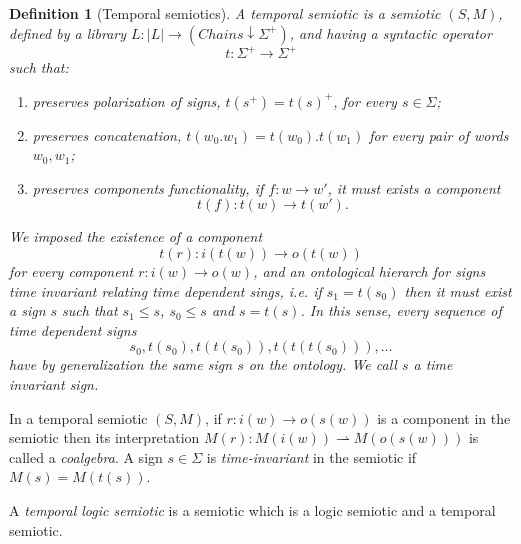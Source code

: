 \documentclass[oribibl]{llncs}
\newtheorem{defn}{Definition}
\begin{document}
\begin{defn}[Temporal semiotics]
A \emph{temporal semiotic} is a semiotic $(S,M)$, defined by a library $L:|L|\rightarrow (Chains\downarrow \Sigma^+)$, and having a syntactic operator \[t:\Sigma^+\rightarrow \Sigma^+\] such that:
\begin{enumerate}
  \item preserves polarization of signs, $t(s^+)=t(s)^+$, for every $s\in\Sigma$;
  \item preserves concatenation, $t(w_0.w_1)=t(w_0).t(w_1)$ for every pair of words $w_0,w_1$;
  \item preserves components functionality, if $f:w\rightarrow w'$, it must exists a component \[t(f):t(w)\rightarrow t(w').\]
\end{enumerate}
We imposed the existence of a component \[t(r):i(t(w))\rightarrow o(t(w))\] for every component $r:i(w)\rightarrow o(w)$, and an ontological hierarch for signs time invariant relating time dependent sings, i.e. if $s_1=t(s_0)$ then it must exist a sign $s$ such that $s_1\leq s$, $s_0\leq s$ and $s=t(s)$. In this sense, every sequence of time dependent signs \[s_0,t(s_0),t(t(s_0)),t(t(t(s_0))),\ldots\]  have by generalization the same sign $s$ on the ontology. We call $s$ a \emph{time invariant sign}.
\end{defn}

In a temporal semiotic $(S,M)$, if $r:i(w)\rightarrow o(s(w))$ is a component in the semiotic then its interpretation $M(r):M(i(w))\rightharpoonup M(o(s(w)))$ is called a \emph{coalgebra}. A sign $s\in\Sigma$ is \emph{time-invariant} in the semiotic if $M(s)=M(t(s))$.

A \emph{temporal logic semiotic} is a semiotic which is a logic semiotic and a temporal semiotic.
\end{document}
